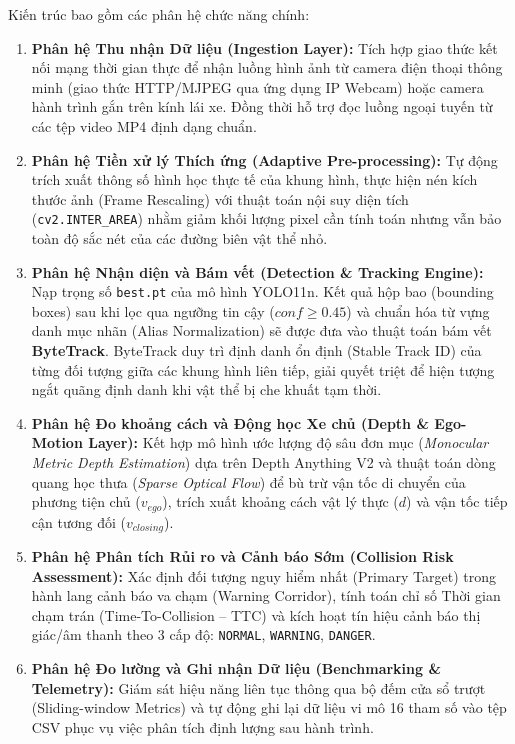 Kiến trúc bao gồm các phân hệ chức năng chính:
\begin{enumerate}
    \item \textbf{Phân hệ Thu nhận Dữ liệu (Ingestion Layer):} Tích hợp giao thức kết nối mạng thời gian thực để nhận luồng hình ảnh từ camera điện thoại thông minh (giao thức HTTP/MJPEG qua ứng dụng IP Webcam) hoặc camera hành trình gắn trên kính lái xe. Đồng thời hỗ trợ đọc luồng ngoại tuyến từ các tệp video MP4 định dạng chuẩn.
    \item \textbf{Phân hệ Tiền xử lý Thích ứng (Adaptive Pre-processing):} Tự động trích xuất thông số hình học thực tế của khung hình, thực hiện nén kích thước ảnh (Frame Rescaling) với thuật toán nội suy diện tích (\texttt{cv2.INTER\_AREA}) nhằm giảm khối lượng pixel cần tính toán nhưng vẫn bảo toàn độ sắc nét của các đường biên vật thể nhỏ.
    \item \textbf{Phân hệ Nhận diện và Bám vết (Detection \& Tracking Engine):} Nạp trọng số \texttt{best.pt} của mô hình YOLO11n. Kết quả hộp bao (bounding boxes) sau khi lọc qua ngưỡng tin cậy ($conf \ge 0.45$) và chuẩn hóa từ vựng danh mục nhãn (Alias Normalization) sẽ được đưa vào thuật toán bám vết \textbf{ByteTrack}. ByteTrack duy trì định danh ổn định (Stable Track ID) của từng đối tượng giữa các khung hình liên tiếp, giải quyết triệt để hiện tượng ngắt quãng định danh khi vật thể bị che khuất tạm thời.
    \item \textbf{Phân hệ Đo khoảng cách và Động học Xe chủ (Depth \& Ego-Motion Layer):} Kết hợp mô hình ước lượng độ sâu đơn mục (\textit{Monocular Metric Depth Estimation}) dựa trên Depth Anything V2 và thuật toán dòng quang học thưa (\textit{Sparse Optical Flow}) để bù trừ vận tốc di chuyển của phương tiện chủ ($v_{ego}$), trích xuất khoảng cách vật lý thực ($d$) và vận tốc tiếp cận tương đối ($v_{closing}$).
    \item \textbf{Phân hệ Phân tích Rủi ro và Cảnh báo Sớm (Collision Risk Assessment):} Xác định đối tượng nguy hiểm nhất (Primary Target) trong hành lang cảnh báo va chạm (Warning Corridor), tính toán chỉ số Thời gian chạm trán (Time-To-Collision -- TTC) và kích hoạt tín hiệu cảnh báo thị giác/âm thanh theo 3 cấp độ: \texttt{NORMAL}, \texttt{WARNING}, \texttt{DANGER}.
    \item \textbf{Phân hệ Đo lường và Ghi nhận Dữ liệu (Benchmarking \& Telemetry):} Giám sát hiệu năng liên tục thông qua bộ đếm cửa sổ trượt (Sliding-window Metrics) và tự động ghi lại dữ liệu vi mô 16 tham số vào tệp CSV phục vụ việc phân tích định lượng sau hành trình.
\end{enumerate}

